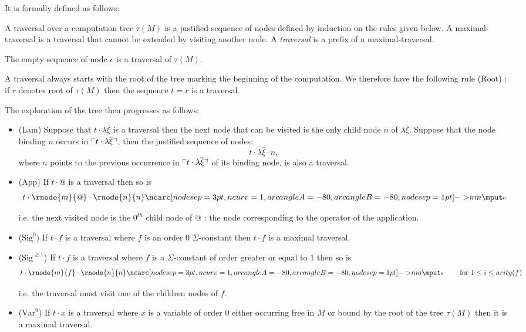 It is formally defined as follows:

\begin{dfn}[Traversal]
\label{def:traversal} A traversal over a computation tree $\tau(M)$
is a justified sequence of nodes defined by induction on the rules
given below. A maximal-traversal is a traversal that cannot be
extended by visiting another node. A \emph{traversal} is a prefix of
a maximal-traversal.

The empty sequence of node $\epsilon$ is a traversal of $\tau(M)$.

A traversal always starts with the root of the tree marking the
beginning of the computation. We therefore have the following rule
(Root) : if $r$ denotes root of $\tau(M)$ then the sequence $t = r$
is a traversal.

The exploration of the tree then progresses as follows:
\begin{itemize}
\item (Lam) Suppose that $t \cdot \lambda \overline{\xi}$ is a traversal then the next node that can be visited is the only child
node $n$ of $\lambda \overline{\xi}$. Suppose that the node binding
$n$ occurs in $\ulcorner t \cdot \lambda \overline{\xi} \urcorner$, then the
justified sequence of nodes:
$$t \cdot \lambda \overline{\xi} \cdot n,$$
where $n$ points to the previous occurrence in $\ulcorner t \cdot
\lambda \overline{\xi} \urcorner$ of its binding node, is also a traversal.

\item (App) If $t \cdot @$ is a traversal then so is
$$t \cdot \rnode{m}{@} \cdot
\rnode{n}{n} \bkptra[nodesep=1pt]{80}{n}{m} \bklabelb{0}
$$

i.e. the next visited node is the $0^{th}$ child node of $@$ : the
node corresponding to the operator of the application.


\item ($\mbox{Sig}^0$) If $t \cdot f$ is a traversal where $f$ is an order 0 $\Sigma$-constant then $t \cdot f$ is a maximal traversal.

\item ($\mbox{Sig}^{\geq 1}$) If $t \cdot f$ is a traversal where $f$ is a $\Sigma$-constant of order greater or equal to
$1$ then so is
$$t \cdot \rnode{m}{f} \cdot
\rnode{n}{n} \bkptra[nodesep=1pt]{80}{n}{m} \bklabelb{0} \qquad
\mbox{ for } 1 \leq i \leq arity(f) $$

i.e. the traversal must visit one of the children nodes of $f$.

\item ($\mbox{Var}^0$) If $t \cdot x$ is a traversal where $x$ is a variable of order $0$ either occurring free in $M$
or bound by the root of the tree $\tau(M)$ then it is a maximal
traversal.


\end{itemize}
\end{dfn}
